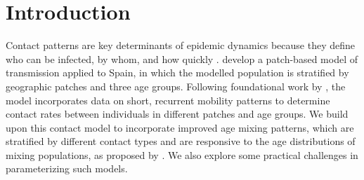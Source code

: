 \section{Introduction}\label{intro}
Contact patterns are key determinants of epidemic dynamics
because they define who can be infected, by whom, and how quickly \cite{Mossong2008}.
\citet{Arenas2020} develop a patch-based model of \covid transmission applied to Spain,
in which the modelled population is stratified by geographic patches and three age groups.
Following foundational work by \citet{Balcan2011,Sattenspiel1995},
the model incorporates data on short, recurrent mobility patterns
to determine contact rates between individuals in different patches and age groups.
We build upon this contact model to incorporate improved age mixing patterns,
which are stratified by different contact types and are responsive to
the age distributions of mixing populations, as proposed by \citet{Arregui2018}.
We also explore some practical challenges in parameterizing such models.